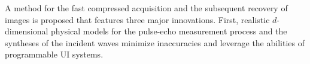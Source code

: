 %
A method for
the fast compressed acquisition and
the subsequent recovery of
images is proposed that features
three major innovations.
First,
realistic $d$-dimensional physical models for
the pulse-echo measurement process and
the syntheses of
the incident waves minimize
inaccuracies and leverage
the abilities of
programmable \ac{UI} systems.
